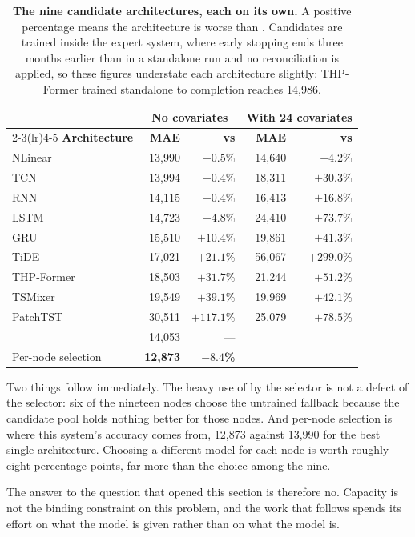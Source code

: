\begin{table}[htp]
\centering
\begin{tabular}{lrrrr}
\toprule
& \multicolumn{2}{c}{\bf No covariates} & \multicolumn{2}{c}{\bf With 24 covariates} \\
\cmidrule(lr){2-3}\cmidrule(lr){4-5}
{\bf Architecture} & {\bf MAE} & {\bf vs \naiveA{}} & {\bf MAE} & {\bf vs \naiveA{}} \\
\midrule
NLinear & 13,990 & $-0.5$\% & 14,640 & $+4.2$\% \\
TCN & 13,994 & $-0.4$\% & 18,311 & $+30.3$\% \\
RNN & 14,115 & $+0.4$\% & 16,413 & $+16.8$\% \\
LSTM & 14,723 & $+4.8$\% & 24,410 & $+73.7$\% \\
GRU & 15,510 & $+10.4$\% & 19,861 & $+41.3$\% \\
TiDE & 17,021 & $+21.1$\% & 56,067 & $+299.0$\% \\
THP-Former & 18,503 & $+31.7$\% & 21,244 & $+51.2$\% \\
TSMixer & 19,549 & $+39.1$\% & 19,969 & $+42.1$\% \\
PatchTST & 30,511 & $+117.1$\% & 25,079 & $+78.5$\% \\
\midrule
\naiveA{} & 14,053 & --- & & \\
Per-node selection & {\bf 12,873} & {\bf $-8.4$\%} & & \\
\bottomrule
\end{tabular}
\caption[Nine architectures]{\textbf{The nine candidate architectures, each on its own.}
A positive percentage means the architecture is worse than \naiveA{}. Candidates are
trained inside the expert system, where early stopping ends three months earlier than in a
standalone run and no reconciliation is applied, so these figures understate each
architecture slightly: THP-Former trained standalone to completion reaches 14,986.}
\label{tab:arch}
\end{table}

Two things follow immediately. The heavy use of \naiveA{} by the selector is not a defect
of the selector: six of the nineteen nodes choose the untrained fallback because the
candidate pool holds nothing better for those nodes. And per-node selection is where this
system's accuracy comes from, 12,873 against 13,990 for the best single architecture.
Choosing a different model for each node is worth roughly eight percentage points, far more
than the choice among the nine.

The answer to the question that opened this section is therefore no. Capacity is not the
binding constraint on this problem, and the work that follows spends its effort on what the
model is given rather than on what the model is.

